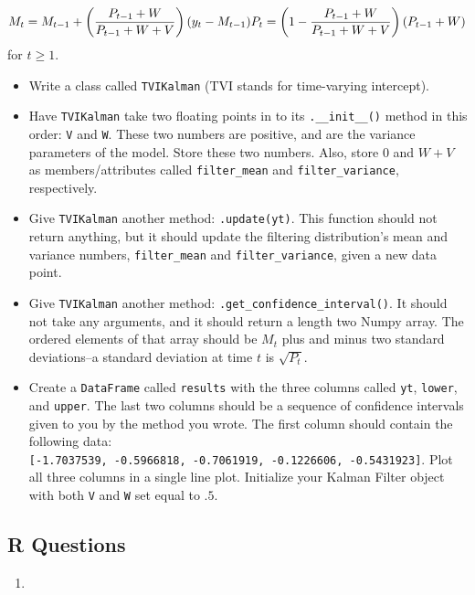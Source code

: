 \documentclass[
  12pt,
  krantz2]{krantz}
\providecommand{\tightlist}{%
  \setlength{\itemsep}{0pt}\setlength{\parskip}{0pt}}
\begin{document}
\[
M_t = M_{t-1} + \left(\frac{P_{t-1} + W}{P_{t-1} + W+V} \right)(y_t - M_{t-1}) \\
P_t = \left(1 - \frac{P_{t-1} + W}{P_{t-1} + W+V} \right)(P_{t-1} + W)
\]
for \(t \ge 1\).

\begin{itemize}
\tightlist
\item
  Write a class called \texttt{TVIKalman} (TVI stands for time-varying intercept).
\item
  Have \texttt{TVIKalman} take two floating points in to its \texttt{.\_\_init\_\_()} method in this order: \texttt{V} and \texttt{W}. These two numbers are positive, and are the variance parameters of the model. Store these two numbers. Also, store \(0\) and \(W+V\) as members/attributes called \texttt{filter\_mean} and \texttt{filter\_variance}, respectively.
\item
  Give \texttt{TVIKalman} another method: \texttt{.update(yt)}. This function should not return anything, but it should update the filtering distribution's mean and variance numbers, \texttt{filter\_mean} and \texttt{filter\_variance}, given a new data point.
\item
  Give \texttt{TVIKalman} another method: \texttt{.get\_confidence\_interval()}. It should not take any arguments, and it should return a length two Numpy array. The ordered elements of that array should be \(M_t\) plus and minus two standard deviations--a standard deviation at time \(t\) is \(\sqrt{P_t}\).
\item
  Create a \texttt{DataFrame} called \texttt{results} with the three columns called \texttt{yt}, \texttt{lower}, and \texttt{upper}. The last two columns should be a sequence of confidence intervals given to you by the method you wrote. The first column should contain the following data: \texttt{{[}-1.7037539,\ -0.5966818,\ -0.7061919,\ -0.1226606,\ -0.5431923{]}}. Plot all three columns in a single line plot. Initialize your Kalman Filter object with both \texttt{V} and \texttt{W} set equal to \(.5\).
\end{itemize}

\hypertarget{r-questions-10}{%
\subsection{R Questions}\label{r-questions-10}}

\begin{enumerate}
\def\labelenumi{\arabic{enumi}.}
\tightlist
\item
\end{enumerate}
\end{document}
